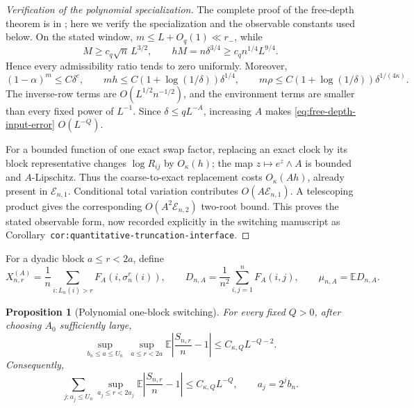 \documentclass[11pt]{article}
\newtheorem{proposition}[theorem]{Proposition}
\theoremstyle{remark}
\newcommand{\Ee}{\mathbb E}
\begin{document}
\begin{proof}[Verification of the polynomial specialization]
The complete proof of the free-depth theorem is in
\cite{LongSwitch2026}; here we verify the specialization and the observable
constants used below.  On the stated window,
$m\le L+O_q(1)\ll r_-$, while
\[
 M\ge c_q\sqrt n\,L^{3/2},
 \qquad
 hM=n\delta^{3/4}\ge c_qn^{1/4}L^{9/4}.
\]
Hence every admissibility ratio tends to zero uniformly.  Moreover,
\[
 (1-\alpha)^m\le C\delta^c,
 \qquad
 mh\le C(1+\log(1/\delta))\delta^{1/4},
 \qquad
 m\rho\le C(1+\log(1/\delta))\delta^{1/(4\kappa)}.
\]
The inverse-row terms are $O(L^{1/2}n^{-1/2})$, and the environment terms
are smaller than every fixed power of $L^{-1}$.  Since
$\delta\le qL^{-A}$, increasing $A$ makes
\eqref{eq:free-depth-input-error} $O(L^{-Q})$.

For a bounded function of one exact swap factor, replacing an exact clock by
its block representative changes $\log R_{ij}$ by $O_\kappa(h)$; the map
$z\mapsto e^z\wedge A$ is bounded and $A$-Lipschitz.  Thus the
coarse-to-exact replacement costs $O_\kappa(Ah)$, already present in
$\mathcal E_{n,1}$.  Conditional total variation contributes
$O(A\mathcal E_{n,1})$.  A telescoping product gives the corresponding
$O(A^2\mathcal E_{n,2})$ two-root bound.  This proves the stated observable
form, now recorded explicitly in the switching manuscript as
Corollary~\texttt{cor:quantitative-truncation-interface}.
\end{proof}

For a dyadic block $a\le r<2a$, define
\[
 X_{n,r}^{(A)}=\frac1n\sum_{i:L_n(i)>r}F_A(i,\sigma_n^r(i)),
 \qquad
 D_{n,A}=\frac1{n^2}\sum_{i,j=1}^nF_A(i,j),
 \qquad
 \mu_{n,A}=\Ee D_{n,A}.
\]

\begin{proposition}[Polynomial one-block switching]
\label{prop:poly-block}
For every fixed $Q>0$, after choosing $A_0$ sufficiently large,
\[
 \sup_{b_n\le a\le U_n}\ \sup_{a\le r<2a}
 \Ee\left|\frac{S_{n,r}}n-1\right|
 \le C_{\kappa,Q}L^{-Q-2}.
\]
Consequently,
\begin{equation}
\label{eq:poly-unweighted-dyadic}
 \sum_{j:a_j\le U_n}
 \sup_{a_j\le r<2a_j}
 \Ee\left|\frac{S_{n,r}}n-1\right|
 \le C_{\kappa,Q}L^{-Q},
 \qquad a_j=2^jb_n.
\end{equation}
\end{proposition}
\end{document}
